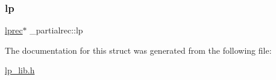 \subsubsection{\texorpdfstring{lp}{lp}}
{\footnotesize\ttfamily \hyperlink{lp__types_8h_afe42f1373b9ee8d824b5cad6a22d24c6}{lprec}$\ast$ \+\_\+partialrec\+::lp}



The documentation for this struct was generated from the following file\+:\begin{DoxyCompactItemize}
\item 
\hyperlink{lp__lib_8h}{lp\+\_\+lib.\+h}\end{DoxyCompactItemize}
